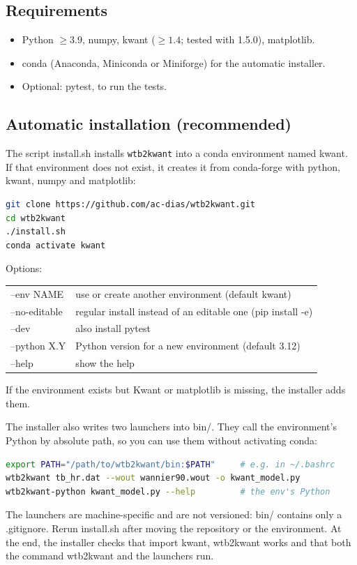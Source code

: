 \documentclass[11pt,a4paper]{article}
\newcommand{\code}[1]{{\ttfamily\def\_{\textunderscore\allowbreak}\def\slash{/\allowbreak}#1}}
\newcommand{\tool}{\texttt{wtb2kwant}}
\begin{document}
\subsection{Requirements}
\begin{itemize}[nosep]
  \item Python $\geq 3.9$, \code{numpy}, \code{kwant} ($\geq 1.4$; tested with 1.5.0),
        \code{matplotlib}.
  \item \code{conda} (Anaconda, Miniconda or Miniforge) for the automatic installer.
  \item Optional: \code{pytest}, to run the tests.
\end{itemize}

\subsection{Automatic installation (recommended)}
The script \code{install.sh} installs \tool{} into a conda environment named \code{kwant}.
If that environment does not exist, it creates it from conda-forge with \code{python},
\code{kwant}, \code{numpy} and \code{matplotlib}:
\begin{lstlisting}[language=bash]
git clone https://github.com/ac-dias/wtb2kwant.git
cd wtb2kwant
./install.sh
conda activate kwant
\end{lstlisting}
Options:
\begin{center}
\begin{tabular}{ll}
\toprule
\code{--env NAME}     & use or create another environment (default \code{kwant}) \\
\code{--no-editable}  & regular install instead of an editable one (\code{pip install -e}) \\
\code{--dev}          & also install \code{pytest} \\
\code{--python X.Y}   & Python version for a new environment (default 3.12) \\
\code{--help}         & show the help \\
\bottomrule
\end{tabular}
\end{center}
If the environment exists but Kwant or matplotlib is missing, the installer adds them.

The installer also writes two launchers into \code{bin/}. They call the environment's
Python by absolute path, so you can use them without activating conda:
\begin{lstlisting}[language=bash]
export PATH="/path/to/wtb2kwant/bin:$PATH"     # e.g. in ~/.bashrc
wtb2kwant tb_hr.dat --wout wannier90.wout -o kwant_model.py
wtb2kwant-python kwant_model.py --help         # the env's Python
\end{lstlisting}
The launchers are machine-specific and are not versioned: \code{bin/} contains only a
\code{.gitignore}. Rerun \code{install.sh} after moving the repository or the environment.
At the end, the installer checks that \code{import kwant, wtb2kwant} works and that both
the command \code{wtb2kwant} and the launchers run.
\end{document}
